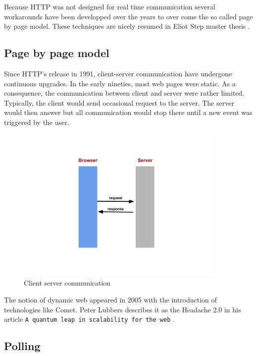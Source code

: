 Because HTTP was not designed for real time communication several workarounds
have been developped over the years to over come the so called page by page
model. These techniques are nicely resumed in Eliot Step master thesis
\citep{Reference2}.

\subsection{Page by page model}

Since HTTP's release in 1991, client-server communication have undergone
continuous upgrades. In the early nineties, most web pages were static. As a
consequence, the communication between client and server  were rather limited.
Typically, the client would send occasional request to the server. The server
would then answer but all communication would stop there until a new event was
triggered by the user.\\ 


\begin{figure}[H]
\centering
\includegraphics[width=0.9\textwidth]{./Figures/client_server_communication.png}
\caption[Client server communication]{Client server communication}
\label{fig:client_server_communication}
\end{figure}

The notion of dynamic web appeared in 2005 with the introduction of technologies
like Comet. Peter Lubbers describes it as the Headache 2.0 in his article
\texttt{A quantum leap in scalability for the web} \citep{Reference32}.\\

\subsection{Polling}

